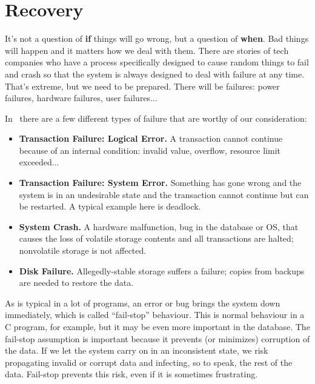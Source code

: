 




\section*{Recovery}

It's not a question of \textbf{if} things will go wrong, but a question of \textbf{when}. Bad things will happen and it matters how we deal with them. There are stories of tech companies who have a process specifically designed to cause random things to fail and crash so that the system is always designed to deal with failure at any time. That's extreme, but we need to be prepared. There will be failures: power failures, hardware failures, user failures...

In~\cite{dsc} there are a few different types of failure that are worthy of our consideration:

\begin{itemize}
	\item \textbf{Transaction Failure: Logical Error.} A transaction cannot continue because of an internal condition: invalid value, overflow, resource limit exceeded...
	\item \textbf{Transaction Failure: System Error.} Something has gone wrong and the system is in an undesirable state and the transaction cannot continue but can be restarted. A typical example here is deadlock.
	\item \textbf{System Crash.} A hardware malfunction, bug in the database or OS, that causes the loss of volatile storage contents and all transactions are halted; nonvolatile storage is not affected.
	\item \textbf{Disk Failure.} Allegedly-stable storage suffers a failure; copies from backups are needed to restore the data.
\end{itemize}

As is typical in a lot of programs, an error or bug brings the system down immediately, which is called ``fail-stop'' behaviour. This is normal behaviour in a C program, for example, but it may be even more important in the database. The fail-stop assumption is important because it prevents (or minimizes) corruption of the data. If we let the system carry on in an inconsistent state, we risk propagating invalid or corrupt data and infecting, so to speak, the rest of the data. Fail-stop prevents this risk, even if it is sometimes frustrating.

